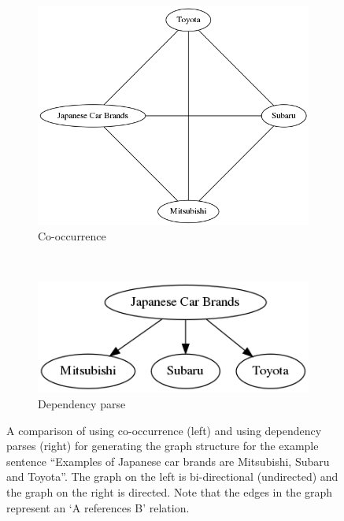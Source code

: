 \documentclass[12pt]{article}
\begin{document}
\begin{figure}
    \centering
    
    \begin{subfigure}[t]{0.45\linewidth}
        \centering
        \includegraphics[width=\linewidth]{figures/simple_co-occurrence.png}
        \caption{Co-occurrence}
        \label{fig:simple co-occurrence}
    \end{subfigure}
    ~
    \begin{subfigure}[t]{0.45\linewidth}
        \centering
        \includegraphics[width=\linewidth]{figures/co-occurrence.png}
        \caption{Dependency parse}
        \label{fig:co-occurrence}
    \end{subfigure}
    
    \caption{A comparison of using co-occurrence (left) and using dependency parses (right) for generating the graph structure for the example sentence ``Examples of Japanese car brands are Mitsubishi, Subaru and Toyota''. The graph on the left is bi-directional (undirected) and the graph on the right is directed. Note that the edges in the graph represent an `A references B' relation.}
    \label{fig:co-occurrence method comparison}
\end{figure}
\end{document}
